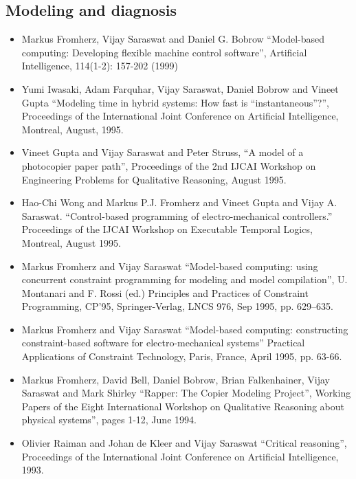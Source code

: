 \documentclass{article}
\begin{document}
\subsection*{Modeling and diagnosis}
\begin{itemize} 
\item  Markus Fromherz, Vijay Saraswat and Daniel G. Bobrow
  ``Model-based computing: Developing flexible machine control
  software'', Artificial Intelligence, 114(1-2): 157-202 (1999)

\item  Yumi Iwasaki, Adam Farquhar, Vijay Saraswat, Daniel Bobrow
  and Vineet Gupta ``Modeling time in hybrid systems: How fast is
  ``instantaneous''?'', Proceedings of the International Joint
  Conference on Artificial Intelligence, Montreal, August, 1995.
  
\item  Vineet Gupta and Vijay Saraswat and Peter Struss, ``A model
  of a photocopier paper path'', Proceedings of the 2nd IJCAI
  Workshop on Engineering Problems for Qualitative Reasoning,
  August 1995.

\item Hao-Chi Wong and Markus P.J. Fromherz and Vineet Gupta and Vijay
  A. Saraswat. ``Control-based programming of electro-mechanical
  controllers.'' Proceedings of the IJCAI Workshop on Executable
  Temporal Logics, Montreal, August 1995.

\item  Markus Fromherz and Vijay Saraswat   ``Model-based
  computing: using concurrent constraint programming for modeling
  and model compilation'', U. Montanari  and F. Rossi (ed.)
  Principles and Practices of Constraint Programming, CP'95,
  Springer-Verlag, LNCS 976, Sep 1995, pp. 629--635. 
  
\item  Markus Fromherz and Vijay Saraswat ``Model-based
  computing: constructing constraint-based software for
  electro-mechanical systems'' Practical Applications of
  Constraint Technology, Paris, France, April 1995, pp. 63-66.

\item  Markus Fromherz, David Bell, Daniel Bobrow, Brian
  Falkenhainer, Vijay Saraswat and Mark Shirley ``{\sc Rapper}:
  The Copier Modeling Project'', Working Papers of the Eight
  International Workshop on Qualitative Reasoning about physical
  systems'', pages 1-12, June 1994. 

\item Olivier Raiman and Johan de Kleer and Vijay Saraswat ``Critical
  reasoning'', Proceedings of the International Joint Conference on
  Artificial Intelligence, 1993.


\end{itemize}
\end{document}
